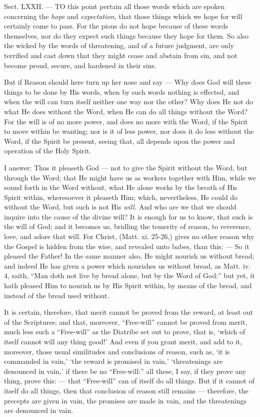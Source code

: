 
Sect. LXXII. — TO this point pertain all those words which are spoken concerning the \emph{hope }and \emph{expectation, }that those things which we hope for will certainly come to pass. For the pious do not hope because of these words themselves, nor do they expect such things because they hope for them. So also the wicked by the words of threatening, and of a future judgment, are only terrified and cast down that they might cease and abstain from sin, and not become proud, secure, and hardened in their sins.

But if Reason should here turn up her nose and say — Why does God will these things to be done by His words, when by such words nothing is effected, and when the will can turn itself neither one way nor the other? Why does He not do what He does without the Word, when He can do all things without the Word? For the will is of no more power, and does no more with the Word, if the Spirit to move within be wanting; nor is it of less power, nor does it do less without the Word, if the Spirit be present, seeing that, all depends upon the power and operation of the Holy Spirit.

I answer: Thus it pleaseth God — not to give the Spirit without the Word, but through the Word; that He might have us as workers together with Him, while we sound forth in the Word without, what He alone works by the breath of His Spirit within, wheresoever it pleaseth Him; which, nevertheless, He could do without the Word, but such is not His \emph{will. }And who are we that we should inquire into the cause of the divine will? It is enough for us to know, that such is the will of God; and it becomes us, bridling the temerity of reason, to reverence, love, and adore that will. For Christ, (Matt. xi. 25-26,) gives no other reason why the Gospel is hidden from the wise, and revealed unto babes, than this: — So it pleased the Father! In the same manner also, He might nourish us without bread; and indeed He has given a power which nourishes us without bread, as Matt. iv. 4, saith, “Man doth not live by bread alone, but by the Word of God:” but yet, it hath pleased Him to nourish us by His Spirit within, by means of the bread, and instead of the bread used without.

It is certain, therefore, that merit cannot be proved from the reward, at least out of the Scriptures; and that, moreover, “Free-will” cannot be proved from merit, much less such a “Free-will” as the Diatribe set out to prove, that is, ‘which of itself cannot will any thing good!’ And even if you grant merit, and add to it, moreover, those usual similitudes and conclusions of reason, such as, ‘it is commanded in vain,’ ‘the reward is promised in vain,’ ‘threatenings are denounced in vain,’ if there be no “Free-will:” all these, I say, if they prove any thing, prove this: — that “Free-will” can of itself do all things. But if it cannot of itself do all things, then that conclusion of reason still remains — therefore, the precepts are given in vain, the promises are made in vain, and the threatenings are denounced in vain.

